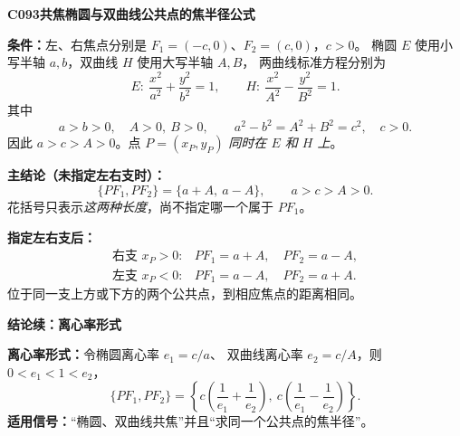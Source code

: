 \begin{statementbox}
\textbf{C093\quad 共焦椭圆与双曲线公共点的焦半径公式}

\textbf{条件：}左、右焦点分别是 $F_1=(-c,0)$、$F_2=(c,0)$，$c>0$。
椭圆 $E$ 使用小写半轴 $a,b$，双曲线 $H$ 使用大写半轴 $A,B$，
两曲线标准方程分别为
\[
\boxed{E:\ \frac{x^2}{a^2}+\frac{y^2}{b^2}=1},\qquad
\boxed{H:\ \frac{x^2}{A^2}-\frac{y^2}{B^2}=1}.
\]
其中
\[
a>b>0,\quad A>0,\ B>0,\qquad
a^2-b^2=A^2+B^2=c^2,\quad c>0.
\]
因此 $a>c>A>0$。点 $P=(x_P,y_P)$ \emph{同时在 $E$ 和 $H$ 上}。

\begin{center}

\end{center}

\textbf{主结论（未指定左右支时）：}
\[
\boxed{\{PF_1,PF_2\}=\{a+A,\ a-A\}},\qquad a>c>A>0.
\]
花括号只表示\emph{这两种长度}，尚不指定哪一个属于 $PF_1$。

\textbf{指定左右支后：}
\[
\boxed{\begin{array}{ll}
\text{右支 }x_P>0:& PF_1=a+A,\quad PF_2=a-A,\\[3pt]
\text{左支 }x_P<0:& PF_1=a-A,\quad PF_2=a+A.
\end{array}}
\]
位于同一支上方或下方的两个公共点，到相应焦点的距离相同。

\end{statementbox}
\clearpage
\begin{statementbox}
\textbf{结论续：离心率形式}

\textbf{离心率形式：}令椭圆离心率 $e_1=c/a$、
双曲线离心率 $e_2=c/A$，则 $0<e_1<1<e_2$，
\[
\boxed{\{PF_1,PF_2\}
=\left\{c\left(\frac1{e_1}+\frac1{e_2}\right),\ 
 c\left(\frac1{e_1}-\frac1{e_2}\right)\right\}}.
\]
\textbf{适用信号：}“椭圆、双曲线共焦”并且“求同一个公共点的焦半径”。
\end{statementbox}
